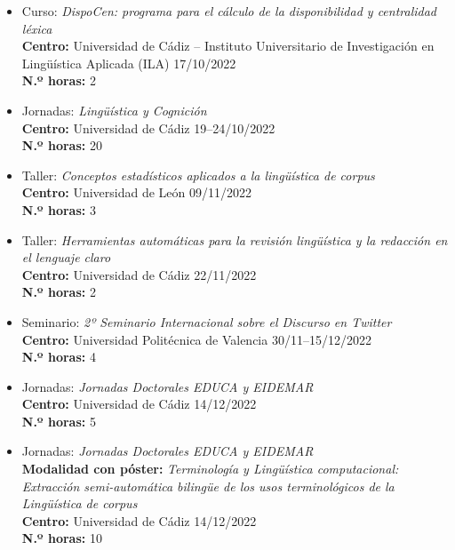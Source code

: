 \begin{enumerate}[label=\alph*)]
\begin{itemize}
\begin{itemize}[label=\textbullet]
  \item Curso: \textit{DispoCen: programa para el cálculo de la disponibilidad y centralidad léxica}\\
  \textbf{Centro:} Universidad de Cádiz – Instituto Universitario de Investigación en Lingüística Aplicada (ILA)
  \hfill 17/10/2022\\
  \textbf{N.º horas:} 2

  \item Jornadas: \textit{Lingüística y Cognición}\\
  \textbf{Centro:} Universidad de Cádiz
  \hfill 19–24/10/2022\\
  \textbf{N.º horas:} 20

  \item Taller: \textit{Conceptos estadísticos aplicados a la lingüística de corpus}\\
  \textbf{Centro:} Universidad de León
  \hfill 09/11/2022\\
  \textbf{N.º horas:} 3

  \item Taller: \textit{Herramientas automáticas para la revisión lingüística y la redacción en el lenguaje claro}\\
  \textbf{Centro:} Universidad de Cádiz
  \hfill 22/11/2022\\
  \textbf{N.º horas:} 2

  \item Seminario: \textit{2º Seminario Internacional sobre el Discurso en Twitter}\\
  \textbf{Centro:} Universidad Politécnica de Valencia
  \hfill 30/11–15/12/2022\\
  \textbf{N.º horas:} 4

  \item Jornadas: \textit{Jornadas Doctorales EDUCA y EIDEMAR}\\
  \textbf{Centro:} Universidad de Cádiz
  \hfill 14/12/2022\\
  \textbf{N.º horas:} 5

  \item Jornadas: \textit{Jornadas Doctorales EDUCA y EIDEMAR}\\
  \textbf{Modalidad con póster:} \textit{Terminología y Lingüística computacional: Extracción semi-automática bilingüe de los usos terminológicos de la Lingüística de corpus}\\
  \textbf{Centro:} Universidad de Cádiz
  \hfill 14/12/2022\\
  \textbf{N.º horas:} 10


\end{itemize}
\end{itemize}
\end{enumerate}
